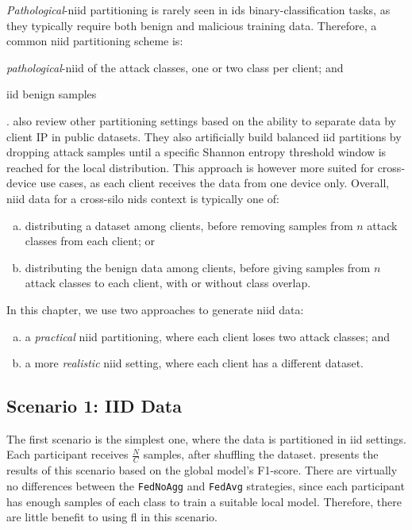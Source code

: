 \emph{Pathological}-\gls{niid} partitioning is rarely seen in \gls{ids} binary-classification tasks, as they typically require both benign and malicious training data. 
Therefore, a common \gls{niid} partitioning scheme is: 
\begin{enumerate*}
    \item \emph{pathological}-\gls{niid} of the attack classes, \eg one or two class per client; and
    \item \gls{iid} benign samples
\end{enumerate*}.
\Textcite{campos_EvaluatingFederatedLearning_2022} also review other partitioning settings based on the ability to separate data by client IP in public datasets. 
They also artificially build balanced \gls{iid} partitions by dropping attack samples until a specific Shannon entropy threshold window is reached for the local distribution.
This approach is however more suited for cross-device use cases, as each client receives the data from one device only.
Overall, \gls{niid} data for a cross-silo \gls{nids} context is typically one of:
\begin{enumerate}[(a)]
    \item distributing a dataset among clients, before removing samples from $n$ attack classes from each client; or
    \item distributing the benign data among clients, before giving samples from $n$ attack classes to each client, with or without class overlap.
\end{enumerate}

\noindent In this chapter, we use two approaches to generate \gls{niid} data:
\begin{enumerate}[(a)]
    \item a \emph{practical} \gls{niid} partitioning, where each client loses two attack classes; and
    \item a more \emph{realistic} \gls{niid} setting, where each client has a different dataset.
\end{enumerate}

\subsection{Scenario 1: IID Data\label{sec:app.demo.iid}}

The first scenario is the simplest one, where the data is partitioned in \gls{iid} settings.
Each participant receives $\frac{N}{C}$ samples, after shuffling the dataset.
 presents the results of this scenario based on the global model's F1-score. 
There are virtually no differences between the \texttt{FedNoAgg} and \texttt{FedAvg} strategies, since each participant has enough samples of each class to train a suitable local model.
Therefore, there are little benefit to using \gls{fl} in this scenario.

